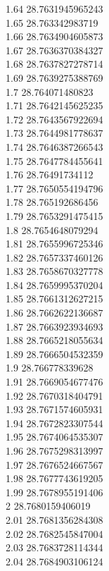 {1.64	28.7631945965243\\
1.65	28.763342983719\\
1.66	28.7634904605873\\
1.67	28.7636370384327\\
1.68	28.7637827278714\\
1.69	28.7639275388769\\
1.7	28.764071480823\\
1.71	28.7642145625235\\
1.72	28.7643567922694\\
1.73	28.7644981778637\\
1.74	28.7646387266543\\
1.75	28.7647784455641\\
1.76	28.76491734112\\
1.77	28.7650554194796\\
1.78	28.765192686456\\
1.79	28.7653291475415\\
1.8	28.7654648079294\\
1.81	28.7655996725346\\
1.82	28.7657337460126\\
1.83	28.7658670327778\\
1.84	28.7659995370204\\
1.85	28.7661312627215\\
1.86	28.7662622136687\\
1.87	28.7663923934693\\
1.88	28.7665218055634\\
1.89	28.7666504532359\\
1.9	28.766778339628\\
1.91	28.7669054677476\\
1.92	28.7670318404791\\
1.93	28.7671574605931\\
1.94	28.7672823307544\\
1.95	28.7674064535307\\
1.96	28.7675298313997\\
1.97	28.7676524667567\\
1.98	28.7677743619205\\
1.99	28.7678955191406\\
2	28.7680159406019\\
2.01	28.7681356284308\\
2.02	28.7682545847004\\
2.03	28.7683728114344\\
2.04	28.7684903106124\\
}
